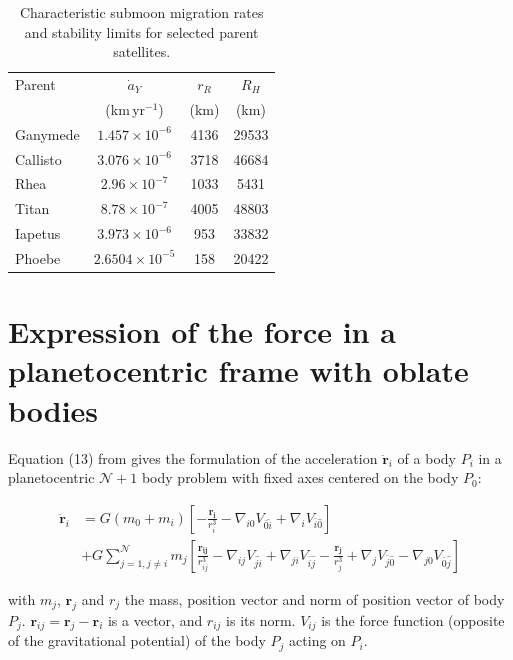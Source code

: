 \documentclass{aa}
\begin{document}
\begin{appendix}
\begin{table}[!ht]
    \centering
    \caption{Characteristic submoon migration rates and stability limits for selected parent satellites.}
    \label{tab:submoon_migration}
    \centering
    \setlength{\tabcolsep}{3.5pt}
    \renewcommand{\arraystretch}{1.15}
    \begin{tabular}{lccc}
    \hline\hline
    Parent &
    $\dot{a}_Y$ &
    $r_{R}$ &
    $R_{H}$ \\
     &
    (km\,yr$^{-1}$) &
    (km) &
    (km) \\
    \hline
    Ganymede & $1.457\times10^{-6}$ & 4136 & 29533 \\
    Callisto  & $3.076\times10^{-6}$ & 3718 & 46684 \\
    Rhea      & $2.96\times10^{-7}$ & 1033 & 5431 \\
    Titan     & $8.78\times10^{-7}$ & 4005 & 48803 \\
    Iapetus   & $3.973\times10^{-6}$ & 953 & 33832 \\
    Phoebe    & $2.6504\times10^{-5}$ & 158 & 20422 \\
    \hline
    \end{tabular}
\end{table}


\section{Expression of the force in a planetocentric frame with oblate bodies}\label{app:force}

Equation (13) from \cite{Lainey2004} gives the formulation of the acceleration $\mathbf{\ddot{r}}_i$ of a body $P_i$ in a planetocentric $\mathcal{N}+1$ body problem with fixed axes centered on the body $P_0$: 

\begin{equation}
\begin{aligned}
    \ddot{\mathbf{r}}_i &= G\left(m_0 +m_i\right) \left[-\frac{\mathbf{r_{i}}}{r_{i}^3} - \nabla_{i0}V_{\bar{0} \hat{i}} + \nabla_{i}V_{\bar{i} \hat{0}}\right] \\&+
    G\sum_{j=1,j\ne i}^\mathcal{N} m_j \left[ \frac{\mathbf{r_{ij}}}{r_{ij}^3} - \nabla_{ij}V_{\bar{j} \hat{i}} + \nabla_{ji}V_{\bar{i} \hat{j}}    -   \frac{\mathbf{r_{j}}}{r_{j}^3} + \nabla_{j}V_{\bar{j} \hat{0}} -\nabla_{j0}V_{\bar{0} \hat{j}}\right] 
\end{aligned}
\end{equation}

with $m_j$, $\mathbf{r}_j$ and $r_j$ the mass, position vector and norm of position vector of body $P_j$. $\mathbf{r}_{ij} = \mathbf{r}_j-\mathbf{r}_{i}$ is a vector, and ${r}_{ij}$ is its norm. $V_{ij}$ is the force function (opposite of the gravitational potential) of the body $P_j$ acting on $P_i$.


\end{appendix}
\end{document}

